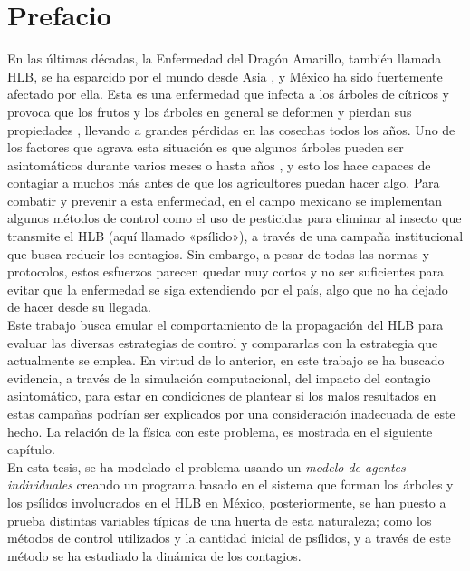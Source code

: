 \chapter{Prefacio}
En las últimas décadas, la Enfermedad del Dragón Amarillo, también llamada HLB, se ha esparcido por el mundo desde Asia \cite{da2008biology}, y México ha sido fuertemente afectado por ella. Esta es una enfermedad que infecta a los árboles de cítricos y provoca que los frutos y los árboles en general se deformen y pierdan sus propiedades \cite{dala2019effect}, llevando a grandes pérdidas en las cosechas todos los años. Uno de los factores que agrava esta situación es que algunos árboles pueden ser asintomáticos durante varios meses o hasta años \cite{lee2015asymptomatic}, y esto los hace capaces de contagiar a muchos más antes de que los agricultores puedan hacer algo. Para combatir y prevenir a esta enfermedad, en el campo mexicano se implementan algunos métodos de control como el uso de pesticidas para eliminar al insecto que transmite el HLB (aquí llamado «psílido»), a través de una campaña institucional que busca reducir los contagios. Sin embargo, a pesar de todas las normas y protocolos, estos esfuerzos parecen quedar muy cortos y no ser suficientes para evitar que la enfermedad se siga extendiendo por el país, algo que no ha dejado de hacer desde su llegada. \\
Este trabajo busca emular el comportamiento de la propagación del HLB para evaluar las diversas estrategias de control y compararlas con la estrategia que actualmente se emplea. En virtud de lo anterior, en este trabajo se ha buscado evidencia, a través de la simulación computacional, del impacto del contagio asintomático, para estar en condiciones de plantear si los malos resultados en estas campañas podrían ser explicados por una consideración inadecuada de este hecho. La relación de la física con este problema, es mostrada en el siguiente capítulo.\\
En esta tesis, se ha modelado el problema usando un \textit{modelo de agentes individuales} creando un programa basado en el sistema que forman los árboles  y los psílidos involucrados en el HLB en México, posteriormente, se han puesto a prueba distintas variables típicas de una huerta de esta naturaleza; como los métodos de control utilizados y la cantidad inicial de psílidos, y a través de este método se ha estudiado la dinámica de los contagios.\\

